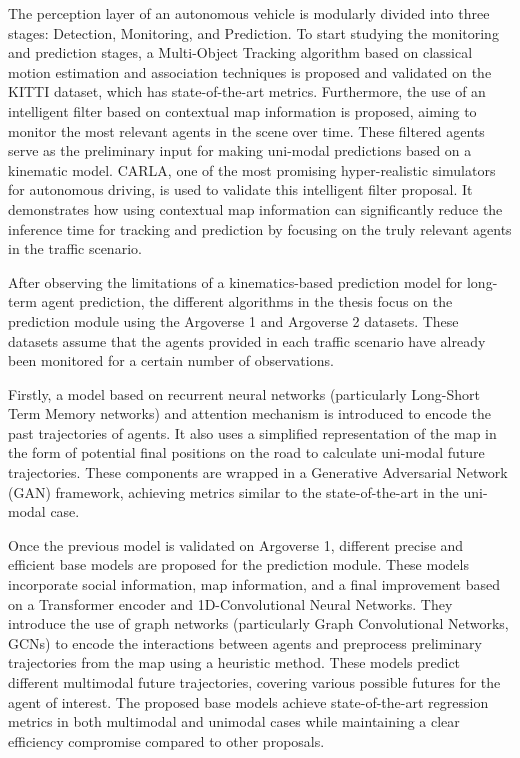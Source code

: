 The perception layer of an autonomous vehicle is modularly divided into three stages: Detection, Monitoring, and Prediction. To start studying the monitoring and prediction stages, a Multi-Object Tracking algorithm based on classical motion estimation and association techniques is proposed and validated on the KITTI dataset, which has state-of-the-art metrics. Furthermore, the use of an intelligent filter based on contextual map information is proposed, aiming to monitor the most relevant agents in the scene over time. These filtered agents serve as the preliminary input for making uni-modal predictions based on a kinematic model. CARLA, one of the most promising hyper-realistic simulators for autonomous driving, is used to validate this intelligent filter proposal. It demonstrates how using contextual map information can significantly reduce the inference time for tracking and prediction by focusing on the truly relevant agents in the traffic scenario.

After observing the limitations of a kinematics-based prediction model for long-term agent prediction, the different algorithms in the thesis focus on the prediction module using the Argoverse 1 and Argoverse 2 datasets. These datasets assume that the agents provided in each traffic scenario have already been monitored for a certain number of observations.

Firstly, a model based on recurrent neural networks (particularly Long-Short Term Memory networks) and attention mechanism is introduced to encode the past trajectories of agents. It also uses a simplified representation of the map in the form of potential final positions on the road to calculate uni-modal future trajectories. These components are wrapped in a Generative Adversarial Network (GAN) framework, achieving metrics similar to the state-of-the-art in the uni-modal case.

Once the previous model is validated on Argoverse 1, different precise and efficient base models are proposed for the prediction module. These models incorporate social information, map information, and a final improvement based on a Transformer encoder and 1D-Convolutional Neural Networks. They introduce the use of graph networks (particularly Graph Convolutional Networks, GCNs) to encode the interactions between agents and preprocess preliminary trajectories from the map using a heuristic method. These models predict different multimodal future trajectories, covering various possible futures for the agent of interest. The proposed base models achieve state-of-the-art regression metrics in both multimodal and unimodal cases while maintaining a clear efficiency compromise compared to other proposals.

